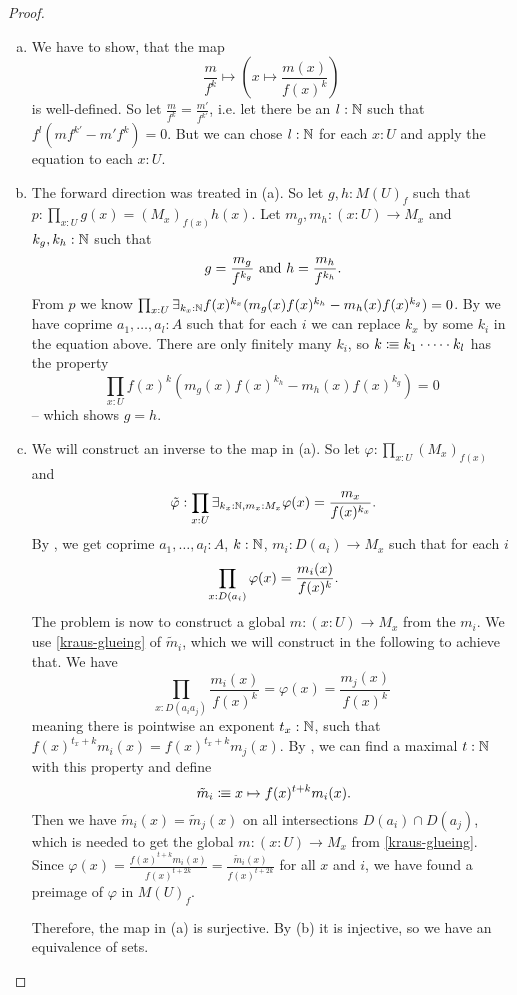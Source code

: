 \begin{proof}
  \begin{enumerate}[(a)]
  \item We have to show, that the map
    \[
      \frac{m}{f^k}\mapsto\left(x\mapsto \frac{m(x)}{f(x)^k}\right)
    \]
    is well-defined. So let $\frac{m}{f^k}=\frac{m'}{f^{k'}}$,
    i.e. let there be an $l:\mathbb{N}$ such that $f^l(mf^{k'}-m'f^k)=0$.
    But we can chose $l:\mathbb{N}$ for each $x:U$ and apply the equation to each $x:U$.
  \item The forward direction was treated in (a).
    So let $g,h:M(U)_f$ such that $p:\prod_{x:U}g(x)={(M_x)_{f(x)}}h(x)$.
    Let $m_g,m_h:(x:U)\to M_x$ and $k_g,k_h:\mathbb{N}$ such that
    \[
      g=\frac{m_g}{f^{k_g}}\text{ and }h=\frac{m_h}{f^{k_h}}
      \rlap{.}
    \]
    From $p$ we know $\prod_{x:U}\exists_{k_x:\mathbb{N}}f(x)^{k_x}(m_g(x)f(x)^{k_h}-m_h(x)f(x)^{k_g})=0$.
    By  we have coprime $a_1,\dots,a_l:A$ such that for each $i$
    we can replace $k_x$ by some $k_i$ in the equation above.
    There are only finitely many $k_i$, so $k\vcentcolon\mspace{-1.2mu}\equiv k_1\cdot\dots\cdot k_l$ has the property
    \[
      \prod_{x:U}f(x)^{k}(m_g(x)f(x)^{k_h}-m_h(x)f(x)^{k_g})=0
    \]
    -- which shows $g=h$.
  \item We will construct an inverse to the map in (a).
    So let $\varphi:\prod_{x:U}(M_x)_{f(x)}$ and
    \[
      \tilde{\varphi}:
      \prod_{x:U}
      \exists_{k_x:\N,m_x:M_x}
      \varphi(x)=\frac{m_x}{f(x)^{k_x}}
      \rlap{.}
    \]
    By ,
    we get coprime $a_1,\dots,a_l:A$, $k:\mathbb{N}$, $m_i:D(a_i)\to M_x$ such that for each $i$
    \[
      \prod_{x:D(a_i)}\varphi(x)=\frac{m_i(x)}{f(x)^{k}}
      \rlap{.}
    \]
    The problem is now to construct a global $m:(x:U)\to M_x$ from the $m_i$.
    We use \cref{kraus-glueing} of $\tilde{m}_i$, which we will construct in the following to achieve that.
    We have
    \[
        \prod_{x:D(a_ia_j)}\frac{m_i(x)}{f(x)^k}=\varphi(x)=\frac{m_j(x)}{f(x)^k}
    \]
    meaning there is pointwise an exponent $t_x:\mathbb{N}$, such that $f(x)^{t_x+k}m_i(x)=f(x)^{t_x+k}m_j(x)$.
    By , we can find a maximal $t:\mathbb{N}$ with this property and define
    \[
      \tilde{m}_i\colonequiv x \mapsto f(x)^{t+k}m_i(x)
      \rlap{.}
    \]
    Then we have $\tilde{m}_i(x)=\tilde{m}_j(x)$ on all intersections $D(a_i)\cap D(a_j)$,
    which is needed to get the global $m:(x:U)\to M_x$ from \cref{kraus-glueing}.
    Since $\varphi(x)=\frac{f(x)^{t+k}m_i(x)}{f(x)^{t+2k}}=\frac{\tilde{m}_i(x)}{f(x)^{t+2k}}$ for all $x$ and $i$,
    we have found a preimage of $\varphi$ in $M(U)_f$.

    Therefore, the map in (a) is surjective.
    By (b) it is injective, so we have an equivalence of sets.
  \end{enumerate}
\end{proof}

